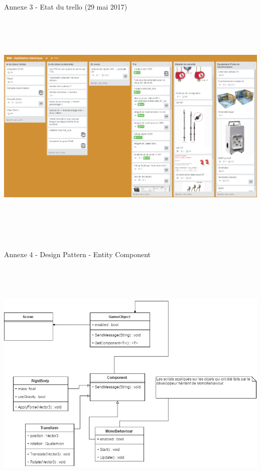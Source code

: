 \documentclass[a4paper]{article}
\begin{document}
    \newpage

    \vfill
    \huge Annexe 3 - Etat du trello (29 mai 2017) \\
    \vspace{10pt}
    \includegraphics[width=16.25cm,height=12cm]{img/trello2}
    \vfill

    \newpage

    \vfill
    \huge Annexe 4 - Design Pattern - Entity Component \\
    \vspace{10pt}
    \includegraphics[width=16.5cm,height=13cm]{img/DiagClasseEntityComponent}
    \vfill
\end{document}
